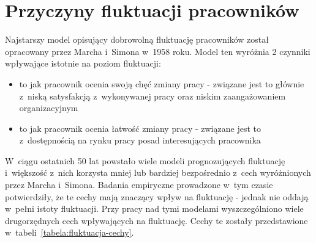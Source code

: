 \section{Przyczyny fluktuacji pracowników}\label{sec:czynniki-wplywajace-na-fluktuacje}

Najstarszy model opisujący dobrowolną fluktuację pracowników został opracowany przez Marcha i~Simona w~1958 roku.
Model ten wyróżnia 2 czynniki wpływające istotnie na poziom fluktuacji:
\begin{itemize}
    \item to jak pracownik ocenia swoją chęć zmiany pracy - związane jest to głównie z~niską satysfakcją z~wykonywanej pracy oraz niskim zaangażowaniem organizacyjnym
    \item to jak pracownik ocenia łatwość zmiany pracy - związane jest to z~dostępnością na rynku pracy posad interesujących pracownika
\end{itemize}

W~ciągu ostatnich 50 lat powstało wiele modeli prognozujących fluktuację i~większość z~nich korzysta mniej lub bardziej bezpośrednio z~cech wyróżnionych przez Marcha i~Simona.
Badania empiryczne prowadzone w~tym czasie potwierdziły, że te cechy mają znaczący wpływ na fluktuację - jednak nie oddają w~pełni istoty fluktuacji.
Przy pracy nad tymi modelami wyszczególniono wiele drugorzędnych cech wpływających na fluktuację.
Cechy te zostały przedstawione w~tabeli~\ref{tabela:fluktuacja-cechy}.

